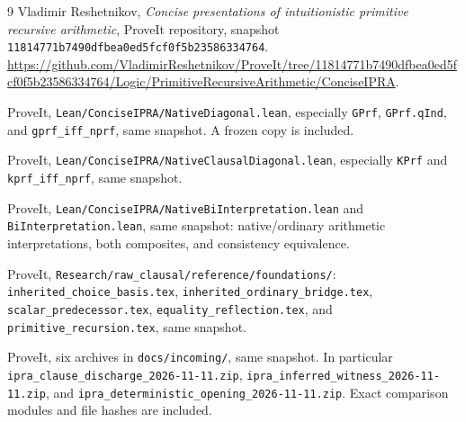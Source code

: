 \documentclass[11pt]{article}
\theoremstyle{definition}\newtheorem{definition}[theorem]{Definition}
\theoremstyle{remark}\newtheorem{remark}[theorem]{Remark}
\newcommand{\file}[1]{\texttt{\small\nolinkurl{#1}}}
\begin{document}
\begin{thebibliography}{9}
 Vladimir Reshetnikov, \emph{Concise presentations of
intuitionistic primitive recursive arithmetic}, ProveIt repository,
snapshot \texttt{11814771b7490dfbea0ed5fcf0f5b23586334764}.
\url{https://github.com/VladimirReshetnikov/ProveIt/tree/11814771b7490dfbea0ed5fcf0f5b23586334764/Logic/PrimitiveRecursiveArithmetic/ConciseIPRA}.

 ProveIt, \file{Lean/ConciseIPRA/NativeDiagonal.lean},
especially \texttt{GPrf}, \texttt{GPrf.qInd}, and
\file{gprf_iff_nprf}, same snapshot. A frozen copy is included.

 ProveIt,
\file{Lean/ConciseIPRA/NativeClausalDiagonal.lean},
especially \texttt{KPrf} and \file{kprf_iff_nprf}, same snapshot.

 ProveIt,
\file{Lean/ConciseIPRA/NativeBiInterpretation.lean} and
\file{BiInterpretation.lean}, same snapshot: native/ordinary arithmetic
interpretations, both composites, and consistency equivalence.

 ProveIt,
\file{Research/raw_clausal/reference/foundations/}:
\file{inherited_choice_basis.tex},
\file{inherited_ordinary_bridge.tex},
\file{scalar_predecessor.tex},
\file{equality_reflection.tex}, and
\file{primitive_recursion.tex}, same snapshot.

 ProveIt, six archives in
\file{docs/incoming/}, same snapshot. In particular
\file{ipra_clause_discharge_2026-11-11.zip},
\file{ipra_inferred_witness_2026-11-11.zip}, and
\file{ipra_deterministic_opening_2026-11-11.zip}.
Exact comparison modules and file hashes are included.
\end{thebibliography}
\end{document}
